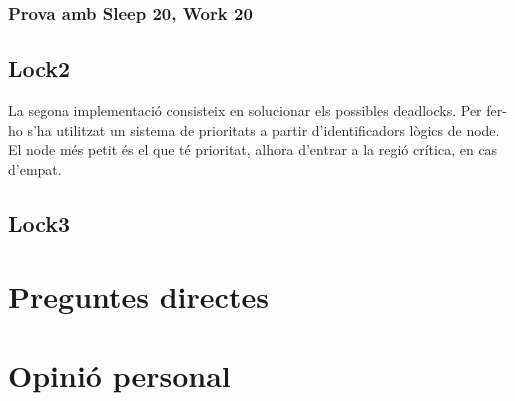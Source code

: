 \documentclass[a4paper, 11pt]{article}
\begin{document}
\subsubsection{Prova amb Sleep 20, Work 20}

\subsection{Lock2}

La segona implementació consisteix en solucionar els possibles deadlocks. Per fer-ho s'ha utilitzat un sistema de prioritats a partir d'identificadors lògics de node. El node més petit és el que té prioritat, alhora d'entrar a la regió crítica, en cas d'empat. 

\subsection{Lock3}

\section{Preguntes directes}


\section{Opinió personal}
\end{document}
